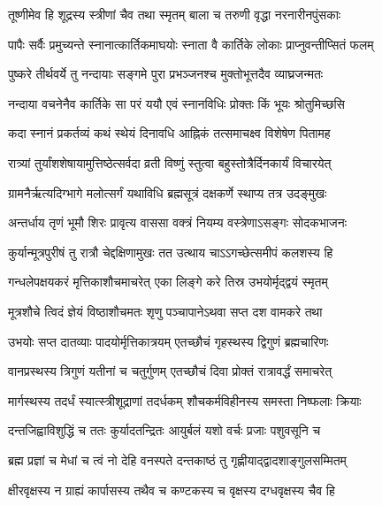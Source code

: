 \twolineshloka
{तूष्णीमेव हि शूद्रस्य स्त्रीणां चैव तथा स्मृतम्}
{बाला च तरुणी वृद्धा नरनारीनपुंसकाः} %

\twolineshloka
{पापैः सर्वैः प्रमुच्यन्ते स्नानात्कार्तिकमाघयोः}
{स्नाता वै कार्तिके लोकाः प्राप्नुवन्तीप्सितं फलम्} %

\twolineshloka
{पुष्करे तीर्थवर्ये तु नन्दायाः सङ्गमे पुरा}
{प्रभञ्जनश्च मुक्तोभूत्तदैव व्याघ्रजन्मतः} %

\twolineshloka
{नन्दाया वचनेनैव कार्तिके सा परं ययौ}
{एवं स्नानविधिः प्रोक्तः किं भूयः श्रोतुमिच्छसि} %





\twolineshloka
{कदा स्नानं प्रकर्तव्यं कथं स्थेयं दिनावधि}
{आह्निकं तत्समाचक्ष्व विशेषेण पितामह} %

\twolineshloka
{रात्र्यां तुर्यांशशेषायामुत्तिष्ठेत्सर्वदा व्रती}
{विष्णुं स्तुत्वा बहुस्तोत्रैर्दिनकार्यं विचारयेत्} %

\twolineshloka
{ग्रामनैर्ऋत्यदिग्भागे मलोत्सर्गं यथाविधि}
{ब्रह्मसूत्रं दक्षकर्णे स्थाप्य तत्र उदङ्मुखः} %

\twolineshloka
{अन्तर्धाय तृणं भूमौ शिरः प्रावृत्य वाससा}
{वक्त्रं नियम्य वस्त्रेणाऽसङ्गः सोदकभाजनः} %

\twolineshloka
{कुर्यान्मूत्रपुरीषं तु रात्रौ चेद्दक्षिणामुखः}
{तत उत्थाय चाऽऽगच्छेत्समीपं कलशस्य हि} %

\twolineshloka
{गन्धलेपक्षयकरं मृत्तिकाशौचमाचरेत्}
{एका लिङ्गे करे तिस्र उभयोर्मृद्द्वयं स्मृतम्} %

\twolineshloka
{मूत्रशौचे त्विदं ज्ञेयं विष्ठाशौचमतः शृणु}
{पञ्चापानेऽथवा सप्त दश वामकरे तथा} %

\twolineshloka
{उभयोः सप्त दातव्याः पादयोर्मृत्तिकात्रयम्}
{एतच्छौचं गृहस्थस्य द्विगुणं ब्रह्मचारिणः} %

\twolineshloka
{वानप्रस्थस्य त्रिगुणं यतीनां च चतुर्गुणम्}
{एतच्छौचं दिवा प्रोक्तं रात्रावर्द्धं समाचरेत्} %

\twolineshloka
{मार्गस्थस्य तदर्धं स्यात्स्त्रीशूद्राणां तदर्धकम्}
{शौचकर्मविहीनस्य समस्ता निष्फलाः क्रियाः} %

\twolineshloka
{दन्तजिह्वाविशुद्धिं च ततः कुर्यादतन्द्रितः}
{आयुर्बलं यशो वर्चः प्रजाः पशुवसूनि च} %

\twolineshloka
{ब्रह्म प्रज्ञां च मेधां च त्वं नो देहि वनस्पते}
{दन्तकाष्ठं तु गृह्णीयाद्द्वादशाङ्गुलसम्मितम्} %

\twolineshloka
{क्षीरवृक्षस्य न ग्राह्यं कार्पासस्य तथैव च}
{कण्टकस्य च वृक्षस्य दग्धवृक्षस्य चैव हि} %


